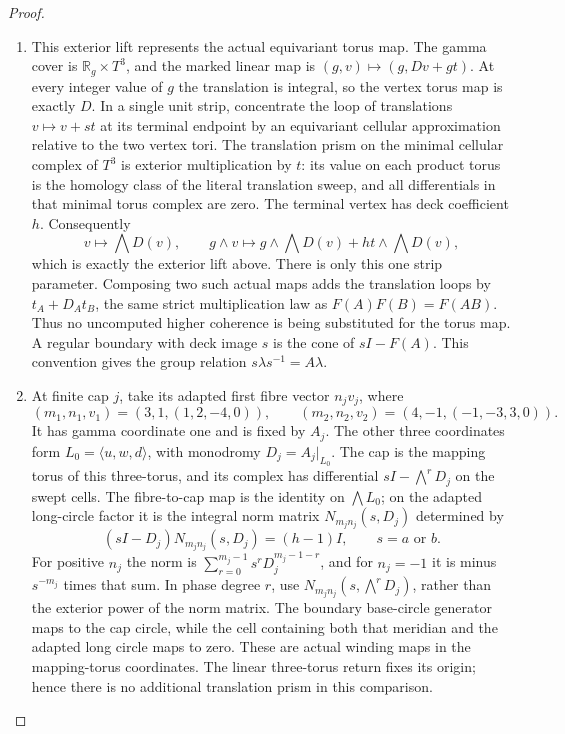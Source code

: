 \begin{proof}
\begin{enumerate}[label=\arabic*.,leftmargin=*]
\item This exterior lift represents the actual equivariant
torus map. The gamma cover is
$\mathbb R_g\times T^3$, and the marked linear map is
$(g,v)\mapsto(g,Dv+gt)$. At every integer value of $g$
the translation is integral, so the vertex torus map
is exactly $D$. In a single unit strip, concentrate
the loop of translations $v\mapsto v+st$ at its
terminal endpoint by an equivariant cellular
approximation relative to the two vertex tori.
The translation prism on the minimal cellular complex
of $T^3$ is exterior multiplication by $t$: its value
on each product torus is the homology class of the
literal translation sweep, and all differentials
in that minimal torus complex are zero. The terminal
vertex has deck coefficient $h$. Consequently
\[
 v\longmapsto\bigwedge D(v),\qquad
 g\wedge v\longmapsto
 g\wedge\bigwedge D(v)+ht\wedge\bigwedge D(v),
 \tag{E.C20}\label{maps:eq:E.C20}
\]
which is exactly the exterior lift above. There is
only this one strip parameter. Composing two such
actual maps adds the translation loops by
$t_A+D_At_B$, the same strict multiplication law
as $F(A)F(B)=F(AB)$. Thus no uncomputed higher
coherence is being substituted for the torus map.
A regular
boundary with deck image $s$ is the cone of $sI-F(A)$.
This convention gives the group relation
$s\lambda s^{-1}=A\lambda$.

\item At finite cap $j$, take its adapted first fibre vector
$n_jv_j$, where
\[
 (m_1,n_1,v_1)=(3,1,(1,2,-4,0)),\qquad
 (m_2,n_2,v_2)=(4,-1,(-1,-3,3,0)).
 \tag{E.C13}\label{maps:eq:E.C13}
\]
It has gamma coordinate one and is fixed by $A_j$.
The other three coordinates form $L_0=\langle u,w,d\rangle$,
with monodromy $D_j=A_j|_{L_0}$. The cap is the
mapping torus of this three-torus, and its complex has
differential $sI-\bigwedge^rD_j$ on the swept cells.
The fibre-to-cap map is the identity on $\bigwedge L_0$;
on the adapted long-circle factor it is the integral
norm matrix $N_{m_jn_j}(s,D_j)$ determined by
\[
 (sI-D_j)N_{m_jn_j}(s,D_j)=(h-1)I,
 \qquad s=a\text{ or }b.
 \tag{E.C14}\label{maps:eq:E.C14}
\]
For positive $n_j$ the norm is
$\sum_{r=0}^{m_j-1}s^rD_j^{m_j-1-r}$, and for
$n_j=-1$ it is minus $s^{-m_j}$ times that sum.
In phase degree $r$, use
$N_{m_jn_j}(s,\bigwedge^rD_j)$, rather than the
exterior power of the norm matrix.
The boundary base-circle generator maps to the cap circle, while
the cell containing both that meridian and the adapted
long circle maps to zero. These are actual winding
maps in the mapping-torus coordinates. The linear
three-torus return fixes its origin; hence there is
no additional translation prism in this comparison.


\end{enumerate}
\end{proof}
